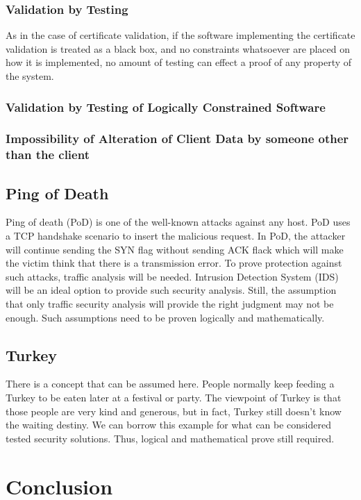 \documentclass[journal]{IEEEtran}
\begin{document}
\subsubsection{Validation by Testing}

As in the case of certificate validation,
if the software implementing the certificate validation is treated
as a black box, and no constraints whatsoever are placed on how it is
implemented, no amount of testing can effect a proof of any
property of the system.

\subsubsection{Validation by Testing of Logically Constrained Software}

\subsubsection{Impossibility of Alteration of Client Data by someone other than the client}

\subsection{Ping of Death}
Ping of death (PoD) is one of the well-known attacks against any host. PoD uses a TCP handshake
scenario to insert the malicious request. In PoD, the attacker will continue sending the SYN flag
without sending ACK flack which will make the victim think that there is a transmission error. To
prove protection against such attacks, traffic analysis will be needed. Intrusion Detection System
(IDS) will be an ideal option to provide such security analysis. Still, the assumption that only
traffic security analysis will provide the right judgment may not be enough. Such assumptions need
to be proven logically and mathematically.


\subsection{Turkey}
There is a concept that can be assumed here. People normally keep feeding a Turkey to be eaten later at
a festival or party. The viewpoint of Turkey is that those people are very kind and generous, but in fact,
Turkey still doesn't know the waiting destiny. We can borrow this example for what can be considered tested
security solutions. Thus, logical and mathematical prove still required.
\section{Conclusion}





\end{document}
